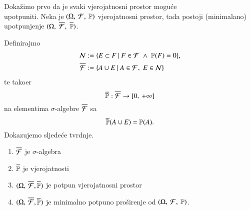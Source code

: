 \begin{rj}[\ref{zad:3.10}]  \label{rj:3.10}
    Doka\v zimo prvo da je svaki vjerojatnosni prostor mogu\' ce\\ upotpuniti.
    Neka je $(\Omega, \: \mathcal{F}, \: \mathbb{P})$ vjerojatnosni prostor, tada postoji (minimalano) upotpunjenje $(\Omega, \; \overline{\mathcal{F}}, \; \overline{\mathbb{P}})$.

    Definirajmo
    \begin{equation*}
        \begin{aligned}
            \mathcal{N} &:= \{{E \subset F} \: | \: {F \in \mathcal{F} \; \land \; \mathbb{P}({F}) = 0}\},\\
            \overline{\mathcal{F}} &:= \{{A \cup E} \: | \: {A \in \mathcal{F}, \; E \in \mathcal{N}}\}
        \end{aligned}
    \end{equation*}
    te tako\dj er
    \begin{equation*}
        \overline{\mathbb{P}} : \overline{\mathcal{F}} \to [{0}, \:{+\infty}]
    \end{equation*}
    na elementima $\sigma$-algebre $\overline{\mathcal{F}}$ sa
    \begin{equation*}
        \overline{\mathbb{P}}(A \cup E) = \mathbb{P}({A}).
    \end{equation*}
    Dokazujemo sljede\' ce tvrdnje.
    \begin{enumerate}[label=(\arabic*)]
        \item   \label{rj:3.10.1}
        $\overline{\mathcal{F}}$ je $\sigma$-algebra
        \item   \label{rj:3.10.2}
        $\overline{\mathbb{P}}$ je vjerojatnosti
        \item   \label{rj:3.10.3}
        $(\Omega, \: \overline{\mathcal{F}}, \overline{\mathbb{P}})$ je potpun vjerojatnosni prostor
        \item   \label{rj:3.10.4}
        $(\Omega, \: \overline{\mathcal{F}}, \overline{\mathbb{P}})$ je minimalno potpuno pro\v sirenje od $(\Omega, \: \mathcal{F}, \: \mathbb{P})$.
    \end{enumerate}


\end{rj}
